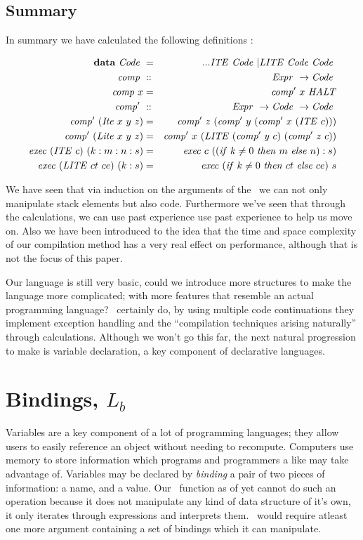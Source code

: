 \documentclass {article}
\begin{document}
\subsection{Summary}

In summary we have calculated the following definitions
												\cite[page 11]{bandh}:

\begin{eqnarray*}
\textbf{data}\ \mathit{Code\ } &=& ...\mathit{ITE\ } \mathit{Code\ } | \mathit{LITE\ } \mathit{Code\ } \mathit{Code\ } \\
\mathit{comp\ } 			&::& \mathit{Expr\ } \rightarrow \mathit{Code\ } \\
\mathit{comp\ } x			 &=& \mathit{comp'\ }  x\ \mathit{HALT} \\
\mathit{comp'\ }			 &::& \mathit{Expr\ } \rightarrow \mathit{Code\ } \rightarrow \mathit{Code\ } \\
\mathit{comp'\ }  (\mathit{Ite\ } x\ y\ z) 
		&=& \mathit{comp'\ }  z\ (\mathit{comp'\ }  y\ (\mathit{comp'\ }  x\ (\mathit{ITE\ } c))) \\
\mathit{comp'\ }  (\mathit{Lite\ } x\ y\ z) 
		&=& \mathit{comp'\ }  x\ (\mathit{LITE\ } (\mathit{comp'\ }  y\ c)\ (\mathit{comp'\ }  z\ c)) \\
\mathit{exec\ } (\mathit{ITE\ } c)\ (k:m:n:s) 
			&=& \mathit{exec\ } c\ ((\mathit{if\ } k \not=0\ \mathit{then\ } m\ \mathit{else\ } n):s) \\
\mathit{exec\ } (\mathit{LITE\ } ct\ ce)\ (k:s) 
			&=& \mathit{exec\ } (\mathit{if\ } k \not=0\ \mathit{then\ } ct\ \mathit{else\ } ce)\ s
\end{eqnarray*}

We have seen that via 
induction on the arguments of the 
\vm\ we can not only manipulate
stack elements but also code.
Furthermore we've seen that through the calculations, 
we can use past experience use past experience to help us
move on.
Also we have been introduced to the idea that
the time  and space complexity
of our compilation method has a very real effect
on performance, although that is not the focus of this paper.

Our language is still very
basic, could we introduce more structures
to make the language more complicated;
with more features that resemble
an actual programming language?
\BH\ certainly do, by using 
multiple code continuations they
implement exception handling and the
``compilation techniques arising naturally''
through calculations\cite[page 24]{bandh}.
Although we won't go this far, the next natural progression
to make is variable declaration, a key component of 
declarative languages.


\pagebreak
\section{Bindings, $L_b$} \label{langbind}

Variables are a key component
of a lot of programming languages;
they allow users to easily reference
an object without needing to recompute.
Computers use memory to store information
which programs and programmers a like may
take advantage of.
Variables may be declared by \emph{binding}
a pair of two pieces of information:
a name, and a value.
Our \eval\ function as of yet 
cannot do such an operation
because it does not manipulate any kind of
data structure of it's own,
it only iterates through
expressions and interprets them.
\eval\ would require atleast one more argument
containing a set of bindings which it can
manipulate.
\end{document}

